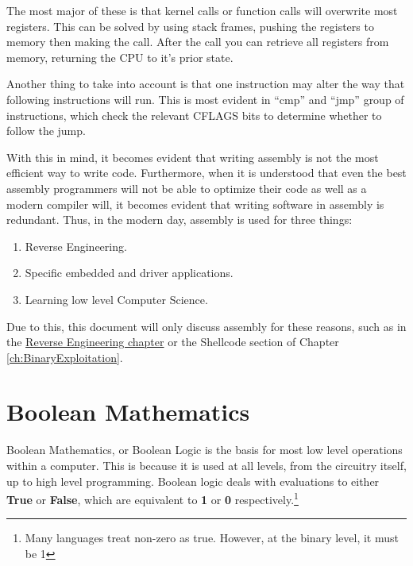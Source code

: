 			The most major of these is that kernel calls or function calls will overwrite most registers. 
			This can be solved by using stack frames, pushing the registers to memory then making the call. 
			After the call you can retrieve all registers from memory, returning the CPU to it's prior state. 

			Another thing to take into account is that one instruction may alter the way that following instructions will run. 
			This is most evident in ``cmp'' and ``jmp'' group of instructions, which check the relevant CFLAGS bits to determine whether to follow the jump. 

			With this in mind, it becomes evident that writing assembly is not the most efficient way to write code. 
			Furthermore, when it is understood that even the best assembly programmers will not be able to optimize their code as well as a modern compiler will, it becomes evident that writing software in assembly is redundant. 
			Thus, in the modern day, assembly is used for three things:
			\begin{enumerate}
				\item Reverse Engineering.
				\item Specific embedded and driver applications.
				\item Learning low level Computer Science. 
			\end{enumerate}
			
			Due to this, this document will only discuss assembly for these reasons, such as in the \hyperref[ch:ReverseEngineering]{Reverse Engineering chapter} or the Shellcode section of Chapter \ref{ch:BinaryExploitation}.
			
	\section{Boolean Mathematics}
		Boolean Mathematics, or Boolean Logic is the basis for most low level operations within a computer. 
		This is because it is used at all levels, from the circuitry itself, up to high level programming. 
		Boolean logic deals with evaluations to either \textbf{True} or \textbf{False}, 
		which are equivalent to \textbf{1} or \textbf{0} respectively.\footnote{Many languages treat non-zero as true. However, at the binary level, it must be 1}

